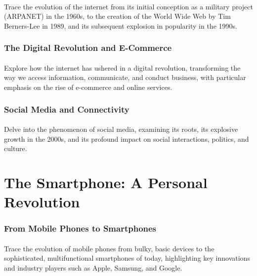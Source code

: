 \documentclass[a4paper,12pt]{book}
\begin{document}
\paragraph{}
Trace the evolution of the internet from its initial conception as a military project (ARPANET) in the 1960s, to the creation of the World Wide Web by Tim Berners-Lee in 1989, and its subsequent explosion in popularity in the 1990s.

\subsubsection*{The Digital Revolution and E-Commerce}
\paragraph{}
Explore how the internet has ushered in a digital revolution, transforming the way we access information, communicate, and conduct business, with particular emphasis on the rise of e-commerce and online services.

\subsubsection*{Social Media and Connectivity}
\paragraph{}
Delve into the phenomenon of social media, examining its roots, its explosive growth in the 2000s, and its profound impact on social interactions, politics, and culture.

\section*{The Smartphone: A Personal Revolution}
\paragraph{}
\subsubsection*{From Mobile Phones to Smartphones}
\paragraph{}
Trace the evolution of mobile phones from bulky, basic devices to the sophisticated, multifunctional smartphones of today, highlighting key innovations and industry players such as Apple, Samsung, and Google.
\end{document}
